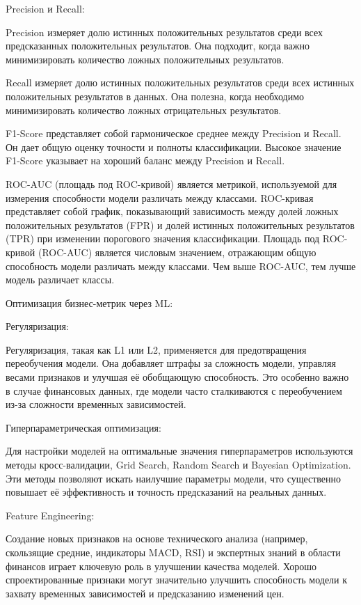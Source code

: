 Precision и Recall:

Precision измеряет долю истинных положительных результатов среди всех предсказанных положительных результатов. Она подходит, когда важно минимизировать количество ложных положительных результатов.

Recall измеряет долю истинных положительных результатов среди всех истинных положительных результатов в данных. Она полезна, когда необходимо минимизировать количество ложных отрицательных результатов.

F1-Score представляет собой гармоническое среднее между Precision и Recall. Он дает общую оценку точности и полноты классификации. Высокое значение F1-Score указывает на хороший баланс между Precision и Recall.

ROC-AUC (площадь под ROC-кривой) является метрикой, используемой для измерения способности модели различать между классами. ROC-кривая представляет собой график, показывающий зависимость между долей ложных положительных результатов (FPR) и долей истинных положительных результатов (TPR) при изменении порогового значения классификации. Площадь под ROC-кривой (ROC-AUC) является числовым значением, отражающим общую способность модели различать между классами. Чем выше ROC-AUC, тем лучше модель различает классы.

Оптимизация бизнес-метрик через ML:

Регуляризация:

Регуляризация, такая как L1 или L2, применяется для предотвращения переобучения модели. Она добавляет штрафы за сложность модели, управляя весами признаков и улучшая её обобщающую способность. Это особенно важно в случае финансовых данных, где модели часто сталкиваются с переобучением из-за сложности временных зависимостей.

Гиперпараметрическая оптимизация:

Для настройки моделей на оптимальные значения гиперпараметров используются методы кросс-валидации, Grid Search, Random Search и Bayesian Optimization. Эти методы позволяют искать наилучшие параметры модели, что существенно повышает её эффективность и точность предсказаний на реальных данных.

Feature Engineering:

Создание новых признаков на основе технического анализа (например, скользящие средние, индикаторы MACD, RSI) и экспертных знаний в области финансов играет ключевую роль в улучшении качества моделей. Хорошо спроектированные признаки могут значительно улучшить способность модели к захвату временных зависимостей и предсказанию изменений цен.

